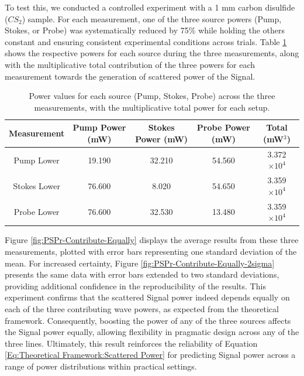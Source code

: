 \documentclass[%
  reprint,
  superscriptaddress,
  amsmath,amssymb,
  aps,
  prapplied,
]{revtex4-2}
\begin{document}
To test this, we conducted a controlled experiment with a 1 mm carbon disulfide ($CS_{2}$) sample. For each measurement, one of the three source powers (Pump, Stokes, or Probe) was systematically reduced by 75\% while holding the others constant and ensuring consistent experimental conditions across trials. Table \ref{tab:PSPr-Contribute-Equally} shows the respective powers for each source during the three measurements, along with the multiplicative total contribution of the three powers for each measurement towards the generation of scattered power of the Signal.

\begin{table}[h]
  \centering
  \renewcommand{\arraystretch}{1.2}
  \begin{tabular}{|c|c|c|c|c|}
    \hline
    \textbf{Measurement} & \textbf{Pump Power (mW)} & \textbf{Stokes Power (mW)} & \textbf{Probe Power (mW)} & \textbf{Total (mW$^{3}$)} \\
    \hline
    Pump Lower & 19.190 & 32.210 & 54.560 & 3.372 $\times 10^{4}$ \\
    Stokes Lower & 76.600 & 8.020 & 54.650 & 3.359 $\times 10^{4}$ \\
    Probe Lower & 76.600 & 32.530 & 13.480 & 3.359 $\times 10^{4}$ \\
    \hline
  \end{tabular}
    \caption{Power values for each source (Pump, Stokes, Probe) across the three measurements, with the multiplicative total power for each setup.}
    \label{tab:PSPr-Contribute-Equally}
\end{table}

Figure \ref{fig:PSPr-Contribute-Equally} displays the average results from these three measurements, plotted with error bars representing one standard deviation of the mean. For increased certainty, Figure \ref{fig:PSPr-Contribute-Equally-2sigma} presents the same data with error bars extended to two standard deviations, providing additional confidence in the reproducibility of the results. This experiment confirms that the scattered Signal power indeed depends equally on each of the three contributing wave powers, as expected from the theoretical framework. Consequently, boosting the power of any of the three sources affects the Signal power equally, allowing flexibility in pragmatic design across any of the three lines. Ultimately, this result reinforces the reliability of Equation \ref{Eq:Theoretical Framework:Scattered Power} for predicting Signal power across a range of power distributions within practical settings.
\end{document}
